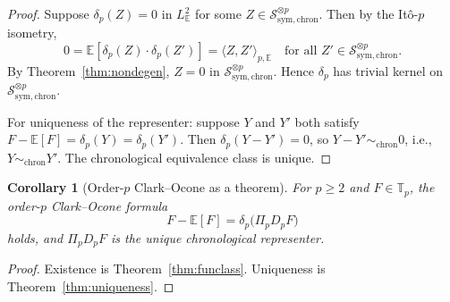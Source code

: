 \documentclass[11pt,reqno]{amsart}
\theoremstyle{plain}
\newtheorem{corollary}[theorem]{Corollary}
\theoremstyle{definition}
\newcommand{\E}{\mathbb{E}}
\newcommand{\sym}{\mathrm{sym}}
\newcommand{\Schw}{\mathcal{S}}
\newcommand{\chron}{\mathrm{chron}}
\begin{document}
\begin{proof}
Suppose $\delta_p(Z) = 0$ in $L^2_\E$ for some $Z \in \Schw_{\sym, \chron}^{\otimes p}$. Then by the Itô-$p$ isometry,
\begin{equation}
0 = \E[\delta_p(Z) \cdot \delta_p(Z')] = \langle Z, Z' \rangle_{p, \E} \quad \text{for all } Z' \in \Schw_{\sym, \chron}^{\otimes p}.
\end{equation}
By Theorem~\ref{thm:nondegen}, $Z = 0$ in $\Schw_{\sym, \chron}^{\otimes p}$. Hence $\delta_p$ has trivial kernel on $\Schw_{\sym, \chron}^{\otimes p}$.

For uniqueness of the representer: suppose $Y$ and $Y'$ both satisfy $F - \E[F] = \delta_p(Y) = \delta_p(Y')$. Then $\delta_p(Y - Y') = 0$, so $Y - Y' \sim_{\chron} 0$, i.e., $Y \sim_{\chron} Y'$. The chronological equivalence class is unique.
\end{proof}

\begin{corollary}[Order-$p$ Clark--Ocone as a theorem]
\label{cor:main}
For $p \geq 2$ and $F \in \mathbb{T}_p$, the order-$p$ Clark--Ocone formula
\begin{equation}
F - \E[F] = \delta_p\bigl(\Pi_p D_p F\bigr)
\end{equation}
holds, and $\Pi_p D_p F$ is the unique chronological representer.
\end{corollary}

\begin{proof}
Existence is Theorem~\ref{thm:funclass}. Uniqueness is Theorem~\ref{thm:uniqueness}.
\end{proof}
\end{document}

